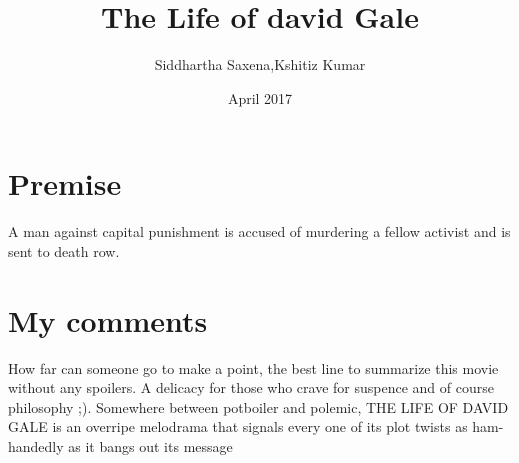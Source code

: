 \documentclass{article}
\title{The Life of david Gale}
\author{Siddhartha Saxena,Kshitiz Kumar}
\date{April 2017}
\begin{document}
\maketitle

\section{Premise}
A man against capital punishment is accused of murdering a fellow activist and is sent to death row.
\section{My comments}

How far can someone go to make a point, the best line to summarize this movie without any spoilers. A delicacy for those who crave for suspence and of course philosophy ;).
Somewhere between potboiler and polemic, THE LIFE OF DAVID GALE is an overripe melodrama that signals every one of its plot twists as ham-handedly as it bangs out its message 
\end{document}
